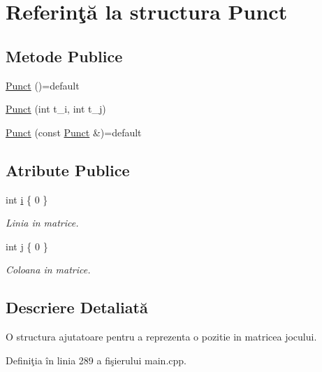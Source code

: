 \hypertarget{structPunct}{}\section{Referinţă la structura Punct}
\label{structPunct}
\subsection*{Metode Publice}
\begin{DoxyCompactItemize}
\item 
\hyperlink{structPunct_a04070b9c9925f7f4a117ecec3d3338af}{Punct} ()=default
\item 
\hyperlink{structPunct_a2ff34bc87cb16eae3d747ff63d51bff0}{Punct} (int t\+\_\+i, int t\+\_\+j)
\item 
\hyperlink{structPunct_afa529a8fdfbc33103f357f754ba4105e}{Punct} (const \hyperlink{structPunct}{Punct} \&)=default
\end{DoxyCompactItemize}
\subsection*{Atribute Publice}
\begin{DoxyCompactItemize}
\item 
\mbox{\label{structPunct_a28bb6f2facdfadbf7e19d651c526a646}} 
int \hyperlink{structPunct_a28bb6f2facdfadbf7e19d651c526a646}{i} \{ 0 \}
\begin{DoxyCompactList}\small\item\em Linia in matrice. \end{DoxyCompactList}\item 
\mbox{\label{structPunct_a065a30931a1d15d6f6c638c4888d254e}} 
int \hyperlink{structPunct_a065a30931a1d15d6f6c638c4888d254e}{j} \{ 0 \}
\begin{DoxyCompactList}\small\item\em Coloana in matrice. \end{DoxyCompactList}\end{DoxyCompactItemize}


\subsection{Descriere Detaliată}
O structura ajutatoare pentru a reprezenta o pozitie in matricea jocului. 

Definiţia în linia 289 a fişierului main.\+cpp.




